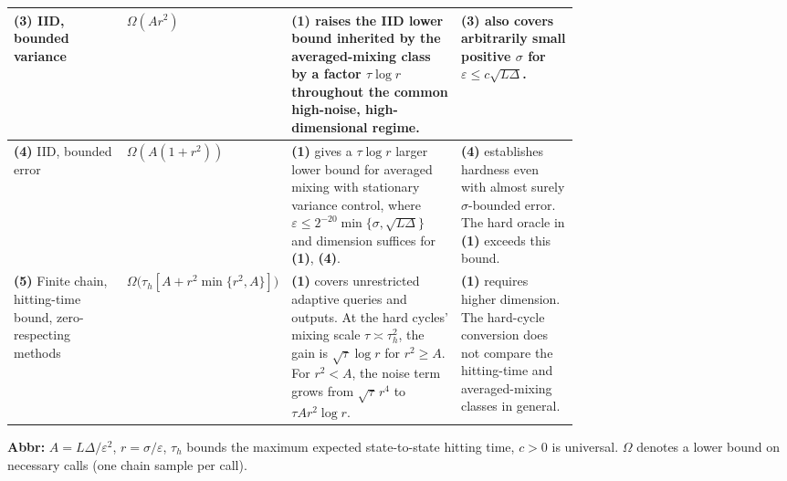 \begin{table}[tp]
\begin{threeparttable}
\begin{tabularx}{\linewidth}{@{}>{\raggedright\arraybackslash}p{0.20\linewidth}>{\raggedright\arraybackslash}p{0.22\linewidth}>{\raggedright\arraybackslash}p{0.30\linewidth}>{\raggedright\arraybackslash}X@{}}
\midrule
\textbf{(3)} IID, bounded variance \citep[Thm.~3]{hnnlArjevani2023V2}
& $\Omega(A r^2)$
& \textbf{(1)} raises the IID lower bound inherited by the averaged-mixing class by a factor $\tau\log r$ throughout the common high-noise, high-dimensional regime.
& \textbf{(3)} also covers arbitrarily small positive $\sigma$ for $\varepsilon\le c\sqrt{L\Delta}$. \\
\midrule
\textbf{(4)} IID, bounded error \citep[Thm.~4.1]{hnnlJin2026V1}
& $\Omega\!\left(A(1+r^2)\right)$
& \textbf{(1)} gives a $\tau\log r$ larger lower bound for averaged mixing with stationary variance control, where $\varepsilon\le2^{-20}\min\{\sigma,\sqrt{L\Delta}\}$ and dimension suffices for \textbf{(1)}, \textbf{(4)}.
& \textbf{(4)} establishes hardness even with almost surely $\sigma$-bounded error. The hard oracle in \textbf{(1)} exceeds this bound. \\
\midrule
\textbf{(5)} Finite chain, hitting-time bound, zero-respecting methods \citep[Thm.~3.1]{hdamSunWei2025}
& $\Omega\!\bigl(\tau_h[A+r^2\min\{r^2,A\}]\bigr)$
& \textbf{(1)} covers unrestricted adaptive queries and outputs. At the hard cycles' mixing scale $\tau\asymp\tau_h^2$, the gain is $\sqrt{\tau}\log r$ for $r^2\ge A$. For $r^2<A$, the noise term grows from $\sqrt{\tau}\,r^4$ to $\tau A r^2\log r$.
& \textbf{(1)} requires higher dimension. The hard-cycle conversion does not compare the hitting-time and averaged-mixing classes in general. \\
\bottomrule
\end{tabularx}
\begin{tablenotes}[flushleft]\footnotesize
\item[] \textbf{Abbr:} $A=L\Delta/\varepsilon^2$, $r=\sigma/\varepsilon$, $\tau_h$ bounds the maximum expected state-to-state hitting time, $c>0$ is universal. $\Omega$ denotes a lower bound on necessary calls (one chain sample per call).
\end{tablenotes}
\end{threeparttable}
\end{table}
